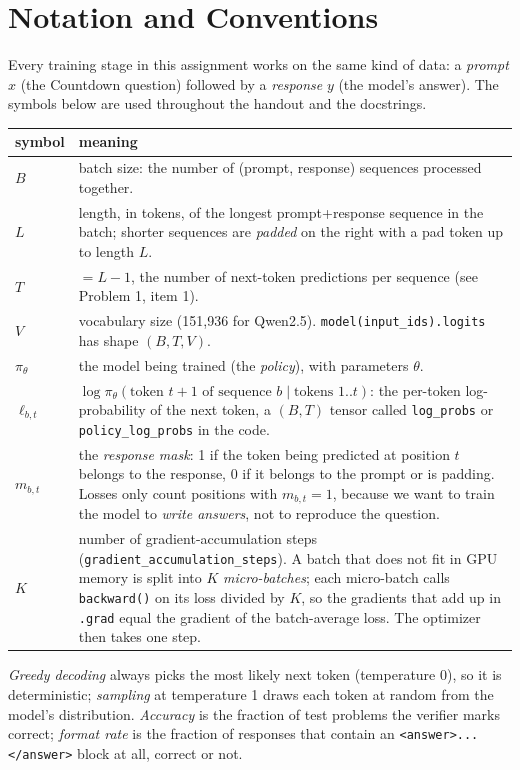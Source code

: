 \documentclass[11pt]{article}
\begin{document}
\section*{Notation and Conventions}
Every training stage in this assignment works on the same kind of data: a \emph{prompt} $x$ (the Countdown
question) followed by a \emph{response} $y$ (the model's answer). The symbols below are used throughout the
handout and the docstrings.
\begin{center}
\begin{tabular}{@{}l>{\raggedright\arraybackslash}p{11.2cm}@{}}
\toprule
symbol & meaning \\
\midrule
$B$ & batch size: the number of (prompt, response) sequences processed together. \\
$L$ & length, in tokens, of the longest prompt+response sequence in the batch; shorter sequences are
      \emph{padded} on the right with a pad token up to length $L$. \\
$T$ & $= L-1$, the number of next-token predictions per sequence (see Problem 1, item 1). \\
$V$ & vocabulary size (151{,}936 for Qwen2.5). \texttt{model(input\_ids).logits} has shape $(B, T, V)$. \\
$\pi_\theta$ & the model being trained (the \emph{policy}), with parameters $\theta$. \\
$\ell_{b,t}$ & $\log\pi_\theta(\text{token } t{+}1 \text{ of sequence } b \mid \text{tokens } 1..t)$: the
      per-token log-probability of the next token, a $(B, T)$ tensor called \texttt{log\_probs} or
      \texttt{policy\_log\_probs} in the code. \\
$m_{b,t}$ & the \emph{response mask}: 1 if the token being predicted at position $t$ belongs to the response,
      0 if it belongs to the prompt or is padding. Losses only count positions with $m_{b,t}=1$, because we want
      to train the model to \emph{write answers}, not to reproduce the question. \\
$K$ & number of gradient-accumulation steps (\texttt{gradient\_accumulation\_steps}). A batch that does not fit
      in GPU memory is split into $K$ \emph{micro-batches}; each micro-batch calls \texttt{backward()} on its loss
      divided by $K$, so the gradients that add up in \texttt{.grad} equal the gradient of the batch-average
      loss. The optimizer then takes one step. \\
\bottomrule
\end{tabular}
\end{center}
\emph{Greedy decoding} always picks the most likely next token (temperature 0), so it is deterministic;
\emph{sampling} at temperature 1 draws each token at random from the model's distribution. \emph{Accuracy} is the fraction of test
problems the verifier marks correct; \emph{format rate} is the fraction of responses that contain an
\texttt{<answer>...</answer>} block at all, correct or not.
\end{document}

